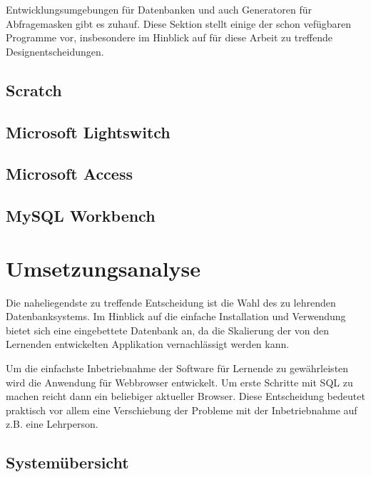 \documentclass[paper=a4,fontsize=11pt,parskip=half]{scrartcl}
\begin{document}
Entwicklungsumgebungen für Datenbanken und auch Generatoren für Abfragemasken gibt es zuhauf. Diese Sektion stellt einige der schon vefügbaren Programme vor, insbesondere im Hinblick auf für diese Arbeit zu treffende Designentscheidungen.

\subsection{Scratch}


\subsection{Microsoft Lightswitch}


\subsection{Microsoft Access}


\subsection{MySQL Workbench}


\section{Umsetzungsanalyse}

Die naheliegendste zu treffende Entscheidung ist die Wahl des zu lehrenden Datenbanksystems. Im Hinblick auf die einfache Installation und Verwendung bietet sich eine eingebettete Datenbank an, da die Skalierung der von den Lernenden entwickelten Applikation vernachlässigt werden kann.

Um die einfachste Inbetriebnahme der Software für Lernende zu gewährleisten wird die Anwendung für Webbrowser entwickelt. Um erste Schritte mit SQL zu machen reicht dann ein beliebiger aktueller Browser. Diese Entscheidung bedeutet praktisch vor allem eine Verschiebung der Probleme mit der Inbetriebnahme auf z.B. eine Lehrperson.


\subsection{Systemübersicht}
\end{document}
